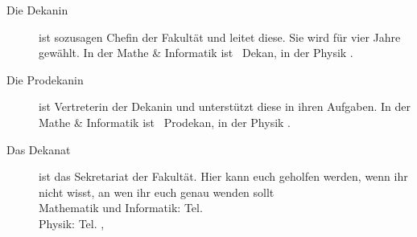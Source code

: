 \begin{description}

    \item[Die Dekanin] ist sozusagen Chefin der Fakultät und leitet diese. Sie wird für vier Jahre gewählt. In der Mathe \& Informatik ist \dekanmathelang\ Dekan, in der Physik \dekanphysiklang .

    \item[Die Prodekanin] ist Vertreterin der Dekanin und unterstützt diese in ihren Aufgaben. In der Mathe \& Informatik ist \prodekanmathe\ Prodekan, in der Physik \prodekanphysik .\\[2em]

    \item[Das Dekanat] ist das Sekretariat der Fakultät. Hier kann euch geholfen werden, wenn ihr nicht wisst, an wen ihr euch genau wenden sollt\\
    Mathematik und Informatik: Tel.  \dekanatmathetelefon \\
    Physik: Tel. \dekanatphysiktelefon , \email{\dekanatphysikemail}


\end{description}
